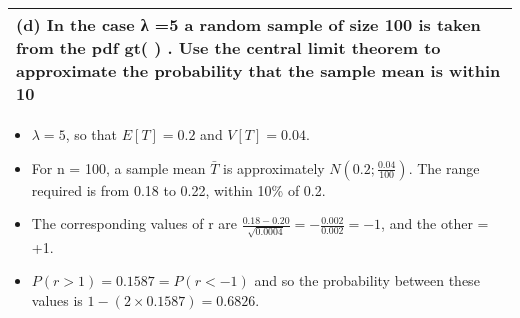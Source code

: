\documentclass[a4paper,12pt]{article}
\begin{document}
\begin{enumerate}
  \begin{table}[ht!]
     \centering
     \begin{tabular}{|p{15cm}|}
     \hline  
(d) In the case 
λ
=5 a random sample of size 100 is taken from the pdf gt( ) .  Use the central limit theorem to approximate the probability that the sample mean is within 10%
\\ \hline
      \end{tabular}
    \end{table}
\begin{itemize}
\item $\lambda = 5$, so that $E[T] = 0.2$ and $V[T] = 0.04$. 

\item For n = 100, a sample mean
$\bar{T}$ is approximately $N(0.2; \frac{0.04}{100})$. The range required is from 0.18 to 0.22,
within 10\% of 0.2. 
\item The corresponding values of r are $\frac{0.18- 0.20}{\sqrt{0.0004}} = -\frac{0.002}{0.002} = -1$,
and the other = +1. 
\item $P(r > 1) = 0.1587 = P(r < -1)$ and so the probability
between these values is $1 - (2 \times 0.1587) = 0.6826$.
\end{itemize}
\end{enumerate}
\end{document}
